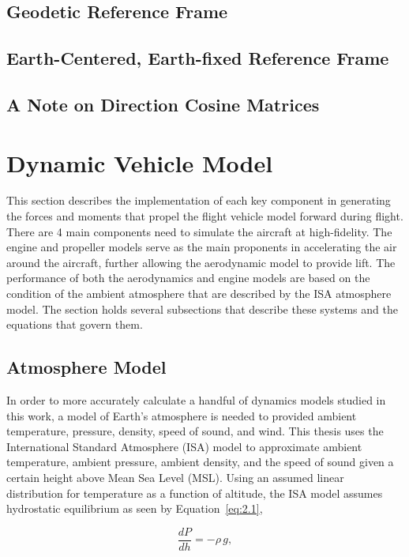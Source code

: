 \documentclass[12pt]{report}
\begin{document}
\subsection{Geodetic Reference Frame}

\subsection{Earth-Centered, Earth-fixed Reference Frame}

\subsection{A Note on Direction Cosine Matrices}

\clearpage
\section{Dynamic Vehicle Model}
This section describes the implementation of each key component in generating the forces and moments that propel the flight vehicle model forward during flight. There are 4 main components need to simulate the aircraft at high-fidelity. The engine and propeller models serve as the main proponents in accelerating the air around the aircraft, further allowing the aerodynamic model to provide lift. The performance of both the aerodynamics and engine models are based on the condition of the ambient atmosphere that are described by the ISA atmosphere model. The section holds several subsections that describe these systems and the equations that govern them.
\clearpage
\subsection{Atmosphere Model}
In order to more accurately calculate a handful of dynamics models studied in this work, a model of Earth's atmosphere is needed to provided ambient temperature, pressure, density, speed of sound, and wind. This thesis uses the International Standard Atmosphere (ISA) model to approximate ambient temperature, ambient pressure, ambient density, and the speed of sound given a certain height above Mean Sea Level (MSL). Using an assumed linear distribution for temperature as a function of altitude, the ISA model assumes hydrostatic equilibrium as seen by Equation~\ref{eq:2.1},

\begin{equation}
  \frac{dP}{dh} = -\rho \, g,
  \label{eq:2.1}
\end{equation}
\end{document}
